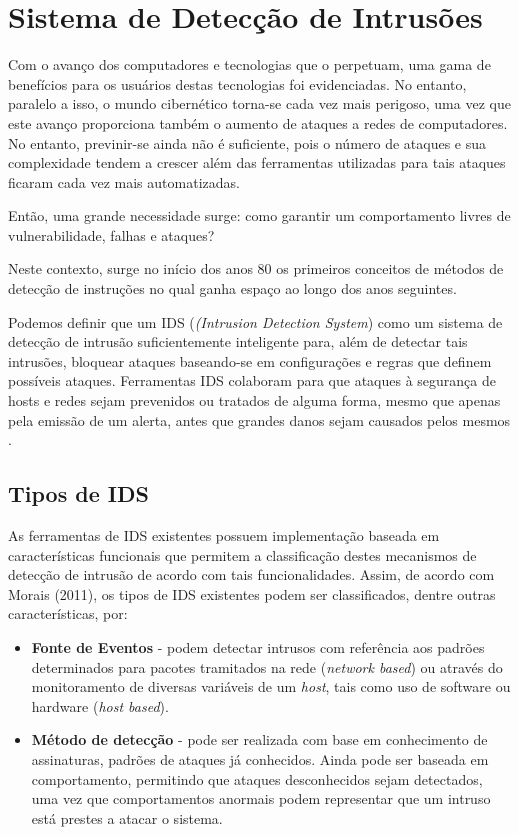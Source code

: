 \chapter{Sistema de Detecção de Intrusões}
\label{chap:IDS}

	Com o avanço dos computadores e tecnologias que o perpetuam, uma gama de benefícios para os usuários destas tecnologias foi evidenciadas. No entanto, paralelo a isso, o mundo cibernético torna-se cada vez mais perigoso, uma vez que este avanço proporciona também o aumento de ataques a redes de computadores. No entanto, previnir-se ainda não é suficiente, pois o número de ataques e sua complexidade tendem a crescer além das ferramentas utilizadas para tais ataques ficaram cada vez mais automatizadas.

	Então, uma grande necessidade surge: como garantir um comportamento livres de vulnerabilidade, falhas e ataques?

	Neste contexto, surge no início dos anos 80 os primeiros conceitos de métodos de detecção de instruções no qual ganha espaço ao longo dos anos seguintes.

	Podemos definir que um IDS (\textit{(Intrusion Detection System}) como um sistema de detecção de intrusão suficientemente inteligente para, além de detectar tais intrusões, bloquear ataques baseando-se em configurações e regras que definem possíveis ataques. Ferramentas IDS colaboram para que ataques à segurança de hosts e redes sejam prevenidos ou tratados de alguma forma, mesmo que apenas pela emissão de um alerta, antes que grandes danos sejam causados pelos mesmos \cite{Comunidade Snort Brasil}.

	\section{Tipos de IDS}
	\label{sec:IDS_Tipos}

	As ferramentas de IDS existentes possuem implementação baseada em características funcionais que permitem a classificação destes mecanismos de detecção de intrusão de acordo com tais funcionalidades. Assim, de acordo com Morais (2011), os tipos de IDS existentes podem ser classificados, dentre outras características, por:
		\begin{itemize}
			\item \textbf{Fonte de Eventos} - podem detectar intrusos com referência aos padrões determinados para pacotes tramitados na rede (\textit{network based}) ou através do monitoramento de diversas variáveis de um \textit{host}, tais como uso de software ou hardware (\textit{host based}).
	
			\item \textbf{Método de detecção} - pode ser realizada com base em conhecimento de assinaturas, padrões de ataques já conhecidos. Ainda pode ser baseada em comportamento, permitindo que ataques desconhecidos sejam detectados, uma vez que comportamentos anormais podem representar que um intruso está prestes a atacar o sistema.	
			\end{itemize}


